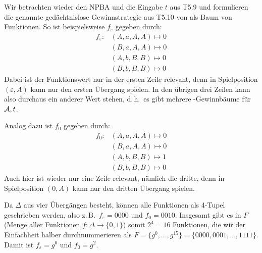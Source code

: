 \documentclass[fontsize=11pt, twoside=false, numbers=autoenddot]{scrbook}
\begin{document}
Wir betrachten wieder den NPBA \Amc und die Eingabe $t$ aus T5.9
und formulieren die genannte gedächtnislose Gewinnstrategie aus T5.10 von \PF
als Baum von Funktionen.
So ist beispielsweise $f_\varepsilon$ gegeben durch:
%
\begin{align*}
f_\varepsilon : {} & (A,a,A,A) \mapsto 0 \\
                   & (B,a,A,A) \mapsto 0 \\
                   & (A,b,B,B) \mapsto 0 \\
                   & (B,b,B,B) \mapsto 0
\end{align*}
%
Dabei ist der Funktionswert nur in der ersten Zeile relevant,
denn in Spielposition $(\varepsilon,A)$ kann \AUT nur den ersten Übergang spielen.
In den übrigen drei Zeilen kann also durchaus ein anderer Wert stehen,
d.\,h.\ es gibt mehrere \PF-Gewinnbäume für $\mathcal{A},t$.

Analog dazu ist $f_0$ gegeben durch:
%
\begin{align*}
f_0 : {} & (A,a,A,A) \mapsto 0 \\
         & (B,a,A,A) \mapsto 0 \\
         & (A,b,B,B) \mapsto 1 \\
         & (B,b,B,B) \mapsto 0
\end{align*}
%
Auch hier ist wieder nur eine Zeile relevant, nämlich die dritte,
denn in Spielposition $(0,A)$ kann \AUT nur den dritten Übergang spielen.

Da $\Delta$ aus vier Übergängen besteht, können alle Funktionen
als 4-Tupel geschrieben werden, also z.\,B.\ $f_\varepsilon = 0000$
und $f_0 = 0010$.
Insgesamt gibt es in $F$ (Menge aller Funktionen $f : \Delta \to \{0,1\}$)
somit $2^4 = 16$ Funktionen, die wir der Einfachheit halber durchnummerieren
als $F = \{g^0,\dots,g^{15}\} = \{0000,0001,\dots,1111\}$.
Damit ist $f_\varepsilon = g^0$ und $f_0 = g^2$.
\end{document}
